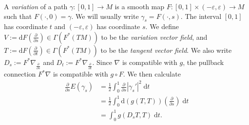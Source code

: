 \documentclass{book}
\renewcommand{\d}{\mathrm{d}}
\renewcommand{\epsilon}{\varepsilon}
\newcommand{\abs}[1]{\left\lvert {#1} \right\rvert}
\newcommand{\parens}[1]{\left( {#1} \right)}
\newcommand{\pdv}[2]{\frac{\partial{#1}}{\partial{#2}}}
\theoremstyle{definition}
\numberwithin{equation}{section}
\begin{document}
A \textit{variation} of a path $\gamma \colon [0,1] \to M$ is a smooth map $F \colon [0,1] \times (-\epsilon,\epsilon) \to M$ such that $F(\cdot,0) = \gamma$. We will usually write $\gamma_s = F(\cdot,s)$. The interval $[0,1]$ has coordinate $t$ and $(-\epsilon,\epsilon)$ has coordinate $s$. We define $V := \d{F}\parens{\pdv{}{s}} \in \Gamma(F^*(TM))$ to be the \textit{variation vector field}, and $T := \d{F}\parens{\pdv{}{t}} \in \Gamma(F^*(TM))$ to be the \textit{tangent vector field}. We also write $D_s := F^* \nabla_{\pdv{}{s}}$ and $D_t := F^* \nabla_{\pdv{}{t}}$. Since $\nabla$ is compatible with $g$, the pullback connection $F^* \nabla$ is compatible with $g \circ F$. We then calculate 
\begin{equation} \begin{aligned} \label{eq:firstVariationStep1}
    \pdv{}{s} E(\gamma_s) &= \frac{1}{2} \int_0^1 \pdv{}{s} \abs{\gamma_s'}^2 \; \d{t} \\
                          &= \frac{1}{2} \int_0^1 \d(g(T,T))\parens{\pdv{}{s}} \; \d{t} \\
                          &= \int_0^1 g(D_s T,T) \; \d{t}.
\end{aligned} \end{equation}
\end{document}
